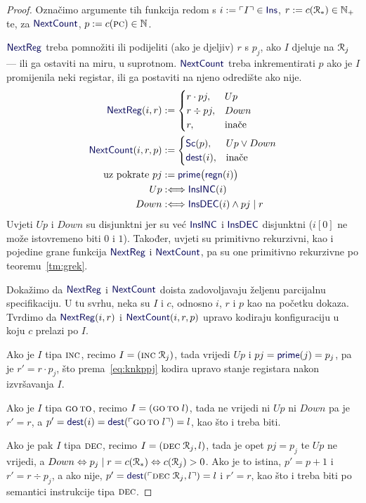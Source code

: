\begin{proof}
    Označimo argumente tih funkcija redom s $i:=\kins{I}\in\f{Ins}$, $r:=c(\mathcal R_{*})\in{\mathbb N}_+$ te, za $\f{NextCount}$, $p:=c(\textsc{pc})\in{\mathbb N}$.

$\f{NextReg}$ treba pomnožiti ili podijeliti (ako je djeljiv) $r$ s $p_j$, ako $I$ djeluje na $\mathcal R_{j}$ --- ili ga ostaviti na miru, u suprotnom. $\f{NextCount}$ treba inkrementirati $p$ ako je $I$ promijenila neki registar, ili ga postaviti na njeno odredište ako nije.
\begin{align}
    \label{eq:NextRegdef}\f{NextReg}(i,r)&:=\begin{cases}
    r\cdot pj,&Up\\
    r\div pj,&Down\\
    r,&\text{inače}
    \end{cases}%
\\
    \f{NextCount}(i,r,p)&:=\begin{cases}
    \f{Sc}(p),&Up\lor Down\\
    \f{dest}(i),&\text{inače}
    \end{cases}%
\\
\text{uz pokrate }
pj&:=\f{prime}\bigl(\f{regn}(i)\bigr)%
\\
Up&:\Longleftrightarrow\f{InsINC}(i)%
\\
Down&:\Longleftrightarrow\f{InsDEC}(i)\land pj\mid r%
\end{align}
Uvjeti $Up$ i $Down$ su disjunktni jer su već $\f{InsINC}$ i $\f{InsDEC}$ disjunktni ($i[0]$ ne može istovremeno biti $0$ i $1$). Također, uvjeti su primitivno rekurzivni, kao i pojedine grane funkcija $\f{NextReg}$ i $\f{NextCount}$, pa su one primitivno rekurzivne po teoremu~\ref{tm:grek}.

Dokažimo da $\f{NextReg}$ i $\f{NextCount}$ doista zadovoljavaju željenu parcijalnu specifikaciju. U tu svrhu, neka su $I$ i $c$, odnosno $i$, $r$ i $p$ kao na početku dokaza. Tvrdimo da $\f{NextReg}(i,r)$ i $\f{NextCount}(i,r,p)$ upravo kodiraju konfiguraciju u koju $c$ prelazi po $I$.

Ako je $I$ tipa $\textsc{inc}$, recimo $I=(\textsc{inc}\;\mathcal R_{j})$, tada vrijedi $Up$ i $pj=\f{prime}(j)=p_j$, pa je $r'=r\cdot p_j$, što prema~\eqref{eq:knkppj} kodira upravo stanje registara nakon izvršavanja $I$.

Ako je $I$ tipa $\textsc{go\,to}$, recimo $I=(\textsc{go\,to}\;l)$, tada ne vrijedi ni $Up$ ni $Down$ pa je $r'=r$, a $p'=\f{dest}(i)=\f{dest}(\kins{\goto\;l})=l$, kao što i treba biti.

Ako je pak $I$ tipa $\textsc{dec}$, recimo $I=(\textsc{dec}\;\mathcal R_{j},l)$, tada je opet $pj=p_j$ te $Up$ ne vrijedi, a $Down\Leftrightarrow p_j\mid r=c(\mathcal R_{*})\Leftrightarrow c(\mathcal R_{j})>0$. Ako je to istina, $p'=p+1$ i $r'=r\div p_j$, a ako nije, $p'=\f{dest}(\kins{\decr jl})=l$ i $r'=r$, kao što i treba biti po semantici instrukcije tipa $\textsc{dec}$.
\end{proof}

